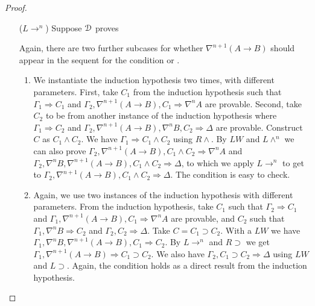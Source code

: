 \begin{proof}
\begin{enumerate}
	\item[($L \rightarrow ^n$)] Suppose $\D$ proves
  \begin{prooftree}
  \end{prooftree}
  Again, there are two further subcases for whether $\nabla^{n+1} (A \rightarrow B)$ should appear in the sequent for the condition \1 or \2.
	\begin{enumerate}
		\item We instantiate the induction hypothesis two times, with different parameters. First, take $C_1$ from the induction hypothesis such that $\Gamma_1 \Rightarrow C_1$ and $\Gamma_2, \nabla^{n+1} (A \rightarrow B), C_1 \Rightarrow \nabla^n A$ are provable. Second, take $C_2$ to be from another instance of the induction hypothesis where $\Gamma_1 \Rightarrow C_2$ and $\Gamma_2, \nabla^{n+1} (A \rightarrow B), \nabla^n B, C_2 \Rightarrow \Delta$ are provable. Construct $C$ as $C_1 \wedge C_2$.	We have $\Gamma_1 \Rightarrow C_1 \wedge C_2$ using $R \wedge$. By $LW$ and $L \wedge ^n$ we can also prove $\Gamma_2, \nabla^{n+1} (A \rightarrow B), C_1 \wedge C_2 \Rightarrow \nabla^n A$ and $\Gamma_2 , \nabla^n B, \nabla^{n+1} (A \rightarrow B), C_1 \wedge C_2 \Rightarrow \Delta$, to which we apply $L \rightarrow ^n$ to get to $\Gamma_2 , \nabla^{n+1} (A \rightarrow B) , C_1 \wedge C_2 \Rightarrow \Delta$.
		The condition \3 is easy to check.

		\item Again, we use two instances of the induction hypothesis with different parameters. From the induction hypothesis, take $C_1$ such that $\Gamma_2 \Rightarrow C_1$ and $\Gamma_1, \nabla^{n+1} (A \rightarrow B), C_1 \Rightarrow \nabla^n A$ are provable, and $C_2$ such that $\Gamma_1, \nabla^n B \Rightarrow C_2$ and $\Gamma_2, C_2 \Rightarrow \Delta$. Take $C = C_1 \supset C_2$. With a $LW$ we have $\Gamma_1, \nabla^n B, \nabla^{n+1} (A \rightarrow B), C_1 \Rightarrow C_2$. By $L \rightarrow ^n$ and $R \supset$ we get $\Gamma_1, \nabla^{n+1} (A \rightarrow B) \Rightarrow C_1 \supset C_2$.
		We also have $\Gamma_2, C_1 \supset C_2 \Rightarrow \Delta$ using $LW$ and $L \supset$. Again, the condition \3 holds as a direct result from the induction hypothesis.
	\end{enumerate}


\end{enumerate}
\end{proof}
